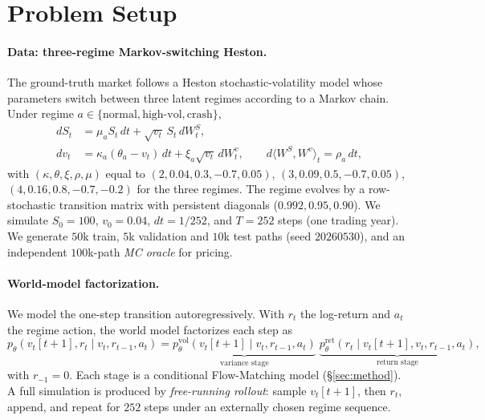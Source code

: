 \documentclass[11pt]{article}
\newcommand{\vt}{v_t}
\begin{document}
\section{Problem Setup}
\label{sec:setup}

\paragraph{Data: three-regime Markov-switching Heston.}
The ground-truth market follows a Heston stochastic-volatility model
\citep{heston1993} whose parameters switch between three latent regimes according
to a Markov chain. Under regime $a\in\{\text{normal},\text{high-vol},\text{crash}\}$,
\begin{align}
dS_t &= \mu_a S_t\,dt + \sqrt{\vt}\,S_t\,dW^S_t, \\
d\vt &= \kappa_a(\theta_a-\vt)\,dt + \xi_a\sqrt{\vt}\,dW^v_t,
\qquad d\langle W^S,W^v\rangle_t = \rho_a\,dt,
\end{align}
with $(\kappa,\theta,\xi,\rho,\mu)$ equal to $(2,0.04,0.3,-0.7,0.05)$,
$(3,0.09,0.5,-0.7,0.05)$, $(4,0.16,0.8,-0.7,-0.2)$ for the three regimes. The
regime evolves by a row-stochastic transition matrix with persistent diagonals
($0.992,0.95,0.90$). We simulate $S_0{=}100$, $v_0{=}0.04$, $dt{=}1/252$, and
$T{=}252$ steps (one trading year). We generate $50$k train, $5$k validation and
$10$k test paths (seed $20260530$), and an independent $100$k-path
\emph{MC oracle} for pricing.

\paragraph{World-model factorization.}
We model the one-step transition autoregressively. With $r_t$ the log-return and
$a_t$ the regime action, the world model factorizes each step as
\begin{equation}
p_\theta(\vt[t{+}1], r_t \mid \vt, r_{t-1}, a_t)
= \underbrace{p^{\mathrm{vol}}_\theta(\vt[t{+}1]\mid \vt, r_{t-1}, a_t)}_{\text{variance stage}}\;
  \underbrace{p^{\mathrm{ret}}_\theta(r_t\mid \vt[t{+}1], \vt, r_{t-1}, a_t)}_{\text{return stage}} ,
\end{equation}
with $r_{-1}{=}0$. Each stage is a conditional Flow-Matching model
(\S\ref{sec:method}). A full simulation is produced by \emph{free-running rollout}:
sample $\vt[t+1]$, then $r_t$, append, and repeat for $252$ steps under an
externally chosen regime sequence.
\end{document}
